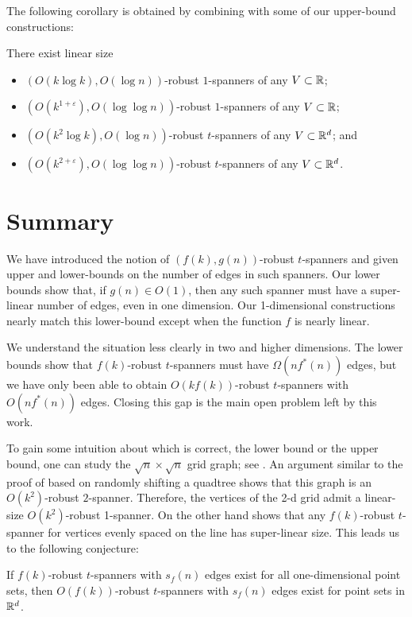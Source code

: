 \documentclass{patmorin}
\newcommand{\eps}{\varepsilon}
\begin{document}
The following corollary is obtained by combining 
with some of our upper-bound constructions:
\begin{cor}
  There exist linear size
  \begin{itemize}
    \item $(O(k\log k),O(\log n))$-robust $1$-spanners of any
      $V\subset \mathbb{R}$;
    \item $(O(k^{1+\eps}),O(\log\log n))$-robust $1$-spanners of any
      $V\subset \mathbb{R}$;
    \item $(O(k^2\log k), O(\log n))$-robust $t$-spanners of any
      $V\subset \mathbb{R}^d$; and
    \item $(O(k^{2+\eps}), O(\log\log n))$-robust $t$-spanners of any
      $V\subset \mathbb{R}^d$.
  \end{itemize}
\end{cor}

\section{Summary}

We have introduced the notion of $(f(k),g(n))$-robust $t$-spanners and
given upper and lower-bounds on the number of edges in such spanners.
Our lower bounds show that, if $g(n)\in O(1)$, then any such spanner
must have a super-linear number of edges, even in one dimension.
Our 1-dimensional constructions nearly match this lower-bound except
when the function $f$ is nearly linear.

We understand the situation less clearly in two and higher dimensions.
The lower bounds show that $f(k)$-robust $t$-spanners must have
$\Omega(nf^*(n))$ edges, but we have only been able to obtain
$O(kf(k))$-robust $t$-spanners with $O(nf^*(n))$ edges.  Closing this
gap is the main open problem left by this work.

To gain some intuition about which is correct, the lower bound or the
upper bound, one can study the $\sqrt{n}\times\sqrt{n}$ grid graph; see
.  An argument similar to the proof of 
based on randomly shifting a quadtree shows that this graph is an
$O(k^2)$-robust $2$-spanner.  Therefore, the vertices of the 2-d
grid admit a linear-size $O(k^2)$-robust 1-spanner.  On the other hand
 shows that any $f(k)$-robust $t$-spanner
for vertices evenly spaced on the line has super-linear size.
This leads us to the following conjecture:

\begin{conj}
If $f(k)$-robust $t$-spanners with $s_f(n)$ edges exist for all one-dimensional point sets, then $O(f(k))$-robust $t$-spanners with $s_f(n)$ edges exist for point sets in $\mathbb{R}^d$.
\end{conj}
\end{document}
